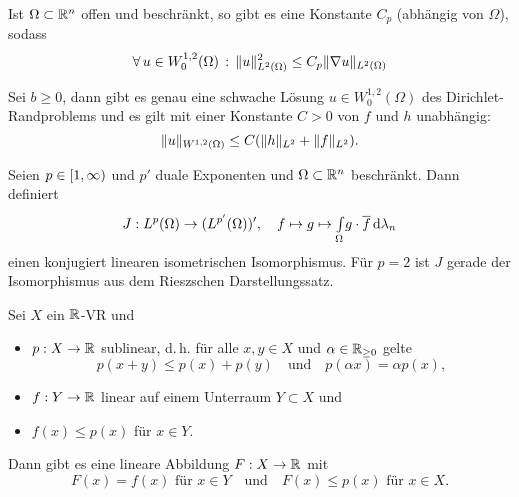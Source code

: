 \documentclass{cheat-sheet}
\begin{document}
\begin{lem}
  Ist $\Omega \subset \mathbb{R}^n$ offen und beschränkt, so gibt es eine Konstante $C_p$ (abhängig von $\Omega$), sodass
  \[ \forall \, {u \in W_0^{1,2}(\Omega)} \,:\, \lVert u\rVert_{L^2(\Omega)}^2 \leq C_p \lVert\nabla u\rVert_{L^2(\Omega)} \]
\end{lem}

\begin{satz}
  Sei $b \geq 0$, dann gibt es genau eine schwache Lösung $u \in W_0^{1,2}(\Omega)$ des Dirichlet-Randproblems und es gilt mit einer Konstante $C > 0$ von $f$ und $h$ unabhängig:
  \[ \lVert u\rVert_{W^{1,2}(\Omega)} \leq C (\lVert h\rVert_{L^2} + \lVert f\rVert_{L^2}). \]
\end{satz}



\begin{satz}
  Seien $p \in \left[ 1, \infty \right)$ und $p'$ duale Exponenten und $\Omega \subset \mathbb{R}^n$ beschränkt. Dann definiert
  \[ J : L^p(\Omega) \to (L^{p'}(\Omega))', \quad f \mapsto g \mapsto {\textstyle \int\limits_{\Omega}^{}} g \cdot \overline{f} \,\mathrm{d} \lambda_n \]
  einen konjugiert linearen isometrischen Isomorphismus. Für $p=2$ ist $J$ gerade der Isomorphismus aus dem Rieszschen Darstellungssatz.
\end{satz}





\begin{samepage}
\begin{satz}
  Sei $X$ ein $\mathbb{R}$-VR und
  \begin{itemize}
    \item $p : X \to \mathbb{R}$ sublinear, d.\,h. für alle $x, y \in X$ und $\alpha \in \mathbb{R}_{\geq 0}$ gelte
    \[ p(x+y) \leq p(x) + p(y) \quad \text{und} \quad p(\alpha x) = \alpha p(x), \]
    \item $f : Y \to \mathbb{R}$ linear auf einem Unterraum $Y \subset X$ und
    \item $f(x) \leq p(x)$ für $x \in Y$.
  \end{itemize}
  Dann gibt es eine lineare Abbildung $F : X \to \mathbb{R}$ mit
  \[ F(x) = f(x) \text{ für $x \in Y$} \quad \text{und} \quad F(x) \leq p(x) \text{ für } x \in X. \]
\end{satz}
\end{samepage}
\end{document}
